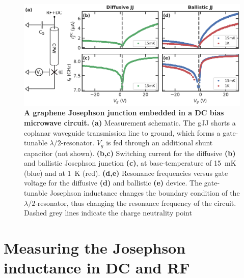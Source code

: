 \begin{figure}[t]
	\centering
	\includegraphics[width=\linewidth]{chapter-gJJ-CPR/figs/Figure1}
	\caption{
		\textbf{A graphene Josephson junction embedded in a DC bias microwave circuit.}
		\textbf{(a)} Measurement schematic.
		The gJJ shorts a coplanar waveguide transmission line to ground, which forms a gate-tunable $\lambda/2$-resonator.
		$V_g$ is fed through an additional shunt capacitor (not shown).
		\textbf{(b,c)} Switching current for the diffusive \textbf{(b)} and ballistic Josephson junction \textbf{(c)}, at base-temperature of \SI{15}{\milli\kelvin} (blue) and at \SI{1}{\kelvin} (red).
		\textbf{(d,e)} Resonance frequencies versus gate voltage for the diffusive \textbf{(d)} and ballistic \textbf{(e)} device.
		The gate-tunable Josephson inductance changes the boundary condition of the $\lambda/2$-resonator, thus changing the resonance frequency of the circuit.
		Dashed grey lines indicate the charge neutrality point
	}
	\label{fig:figure1}
\end{figure}


\section{Measuring the Josephson inductance in DC and RF}

